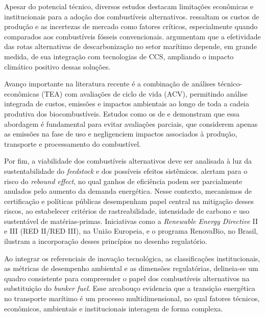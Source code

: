 Apesar do potencial técnico, diversos estudos destacam limitações econômicas e institucionais para a adoção dos combustíveis alternativos. \citet{lindstad_reduction_2021} ressaltam os custos de produção e as incertezas de mercado como fatores críticos, especialmente quando comparados aos combustíveis fósseis convencionais. \citet{mukherjee_techno-economic_2023} argumentam que a efetividade das rotas alternativas de descarbonização no setor marítimo depende, em grande medida, de sua integração com tecnologias de \gls{CCS}, ampliando o impacto climático positivo dessas soluções.

Avanço importante na literatura recente é a combinação de análises técnico-econômicas (\gls{TEA}) com avaliações de ciclo de vida (\gls{ACV}), permitindo análise integrada de custos, emissões e impactos ambientais ao longo de toda a cadeia produtiva dos biocombustíveis. Estudos como os de \citet{tan_biofuel_2021} e \citet{li_techno-economic_2022} demonstram que essa abordagem é fundamental para evitar avaliações parciais, que considerem apenas as emissões na fase de uso e negligenciem impactos associados à produção, transporte e processamento do combustível.

Por fim, a viabilidade dos combustíveis alternativos deve ser analisada à luz da sustentabilidade do \emph{feedstock} e dos possíveis efeitos sistêmicos. \citet{zink_circular_2017} alertam para o risco do \emph{rebound effect}, no qual ganhos de eficiência podem ser parcialmente anulados pelo aumento da demanda energética. Nesse contexto, mecanismos de certificação e políticas públicas desempenham papel central na mitigação desses riscos, ao estabelecer critérios de rastreabilidade, intensidade de carbono e uso sustentável de matérias-primas. Iniciativas como a \emph{Renewable Energy Directive} II e III (RED II/RED III), na União Europeia, e o programa RenovaBio, no Brasil, ilustram a incorporação desses princípios no desenho regulatório.

Ao integrar os referenciais de inovação tecnológica, as classificações institucionais, as métricas de desempenho ambiental e as dimensões regulatórias, delineia-se um quadro consistente para compreender o papel dos combustíveis alternativos na substituição do \emph{bunker fuel}. Esse arcabouço evidencia que a transição energética no transporte marítimo é um processo multidimensional, no qual fatores técnicos, econômicos, ambientais e institucionais interagem de forma complexa.

